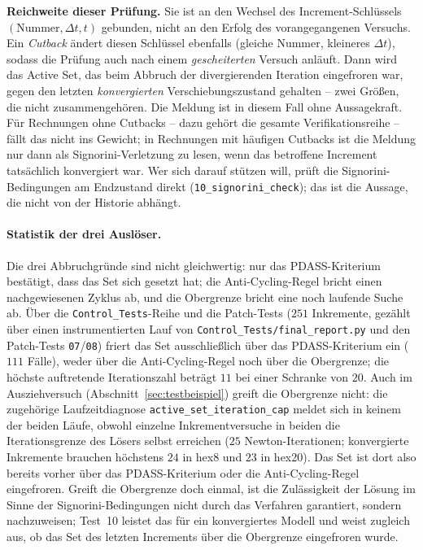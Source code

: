 \documentclass[a4paper,11pt]{article}
\newcommand{\code}[1]{\texttt{\small #1}}
\newcommand{\file}[1]{\texttt{\small #1}}
\begin{document}
\medskip
\noindent\textbf{Reichweite dieser Prüfung.} Sie ist an den Wechsel des Increment-Schlüssels
$(\text{Nummer},\Delta t,t)$ gebunden, nicht an den Erfolg des vorangegangenen Versuchs. Ein
\emph{Cutback} ändert diesen Schlüssel ebenfalls (gleiche Nummer, kleineres $\Delta t$), sodass die
Prüfung auch nach einem \emph{gescheiterten} Versuch anläuft. Dann wird das Active Set, das beim
Abbruch der divergierenden Iteration eingefroren war, gegen den letzten \emph{konvergierten}
Verschiebungszustand gehalten -- zwei Größen, die nicht zusammengehören. Die Meldung ist in diesem
Fall ohne Aussagekraft. Für Rechnungen ohne Cutbacks -- dazu gehört die gesamte
Verifikationsreihe -- fällt das nicht ins Gewicht; in Rechnungen mit häufigen Cutbacks ist die
Meldung nur dann als Signorini-Verletzung zu lesen, wenn das betroffene Increment tatsächlich
konvergiert war. Wer sich darauf stützen will, prüft die Signorini-Bedingungen am Endzustand
direkt (\file{10\_signorini\_check}); das ist die Aussage, die nicht von der Historie abhängt.

\paragraph{Statistik der drei Auslöser.}
Die drei Abbruchgründe sind nicht gleichwertig: nur das PDASS-Kriterium bestätigt, dass das Set sich
gesetzt hat; die Anti-Cycling-Regel bricht einen nachgewiesenen Zyklus ab, und die Obergrenze bricht
eine noch laufende Suche ab. Über die \file{Control\_Tests}-Reihe und die Patch-Tests ($251$
Inkremente, gezählt über einen instrumentierten Lauf von \file{Control\_Tests/final\_report.py}
und den Patch-Tests \file{07}/\file{08}) friert das Set ausschließlich über das PDASS-Kriterium ein ($111$ Fälle), weder über
die Anti-Cycling-Regel noch über die Obergrenze; die höchste auftretende Iterationszahl beträgt
$11$ bei einer Schranke von $20$. Auch im Ausziehversuch (Abschnitt~\ref{sec:testbeispiel}) greift
die Obergrenze nicht: die zugehörige Laufzeitdiagnose \code{active\_set\_iteration\_cap} meldet sich
in keinem der beiden Läufe, obwohl einzelne Inkrementversuche in beiden die Iterationsgrenze des
Lösers selbst erreichen ($25$ Newton-Iterationen; konvergierte Inkremente brauchen höchstens $24$
in hex8 und $23$ in hex20). Das Set
ist dort also bereits vorher über das PDASS-Kriterium oder die Anti-Cycling-Regel eingefroren.
Greift die Obergrenze doch einmal, ist die Zulässigkeit der Lösung im Sinne der
Signorini-Bedingungen nicht durch das Verfahren garantiert, sondern nachzuweisen; Test~10 leistet
das für ein konvergiertes Modell und weist zugleich aus, ob das Set des letzten Increments über die
Obergrenze eingefroren wurde.
\end{document}

